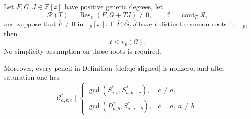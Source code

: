 \begin{lemma}\label{lem:qc-aligned}
Let $F,G,J\in\mathbb Z[x]$ have positive generic degrees, let
\[
 \mathcal R(T)=\operatorname{Res}_x(F,G+TJ)\ne0,
 \qquad \mathcal C=\operatorname{cont}_T\mathcal R,
\]
and suppose that $\overline F\ne0$ in $\mathbb F_p[x]$.  If
$\overline F,\overline G,\overline J$ have $t$ distinct common roots
in~$\mathbb F_p$, then
\begin{equation}\label{eq:qc-aligned-valuation}
 t\le v_p(\mathcal C).
\end{equation}
No simplicity assumption on those roots is required.

Moreover, every pencil in Definition~\ref{def:qc-aligned} is nonzero,
and after saturation one has
\begin{equation}\label{eq:qc-aligned-divisibility}
 \mathcal C^*_{a,b,c}\mid
 \begin{cases}
  \gcd(S^*_{a,b},S^*_{a,b+c}),&c\ne a,\\
  \gcd(D^*_{a,b},S^*_{a,a+b}),&c=a,\ a\ne b.
 \end{cases}
\end{equation}
\end{lemma}

